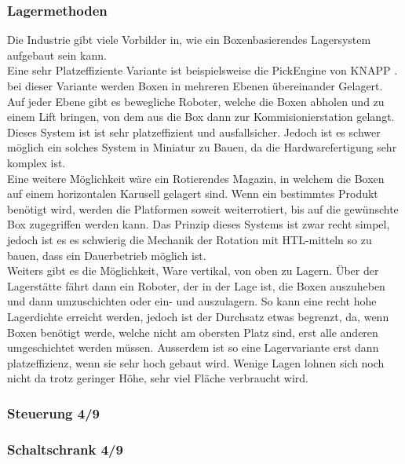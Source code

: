 \subsubsection{Lagermethoden}
Die Industrie gibt viele Vorbilder in, wie ein Boxenbasierendes Lagersystem aufgebaut sein kann. \\
Eine sehr Platzeffiziente Variante ist beispielsweise die PickEngine von KNAPP \cite{pickengine}. bei dieser Variante werden Boxen in mehreren Ebenen übereinander Gelagert. Auf jeder Ebene gibt es bewegliche Roboter, welche die Boxen abholen und zu einem Lift bringen, von dem aus die Box dann zur Kommisionierstation gelangt. Dieses System ist ist sehr platzeffizient und ausfallsicher. Jedoch ist es schwer möglich ein solches System in Miniatur zu Bauen, da die Hardwarefertigung sehr komplex ist.\\
Eine weitere Möglichkeit wäre ein Rotierendes Magazin, in welchem die Boxen auf einem horizontalen Karusell gelagert sind. Wenn ein bestimmtes Produkt benötigt wird, werden die Platformen soweit weiterrotiert, bis auf die gewünschte Box zugegriffen werden kann. Das Prinzip dieses Systems ist zwar recht simpel, jedoch ist es es schwierig die Mechanik der Rotation mit HTL-mitteln so zu bauen, dass ein Dauerbetrieb möglich ist. \\
Weiters gibt es die Möglichkeit, Ware vertikal, von oben zu Lagern. Über der Lagerstätte fährt dann ein Roboter, der in der Lage ist, die Boxen auszuheben und dann umzuschichten oder ein- und auszulagern. So kann eine recht hohe Lagerdichte erreicht werden, jedoch ist der Durchsatz etwas begrenzt, da, wenn Boxen benötigt werde, welche nicht am obersten Platz sind, erst alle anderen umgeschichtet werden müssen. Ausserdem ist so eine Lagervariante erst dann platzeffizienz, wenn sie sehr hoch gebaut wird. Wenige Lagen lohnen sich noch nicht da trotz geringer Höhe, sehr viel Fläche verbraucht wird.



\subsubsection{Steuerung 4/9}


\subsubsection{Schaltschrank 4/9}


